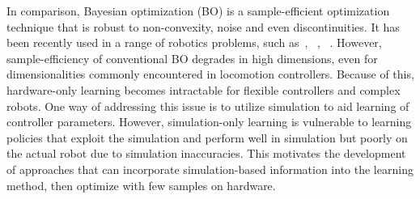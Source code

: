 In comparison, Bayesian optimization (BO) is a sample-efficient optimization technique that is robust to non-convexity, noise and even discontinuities. It has been recently used in a range of robotics problems, such as~\citet{calandra2016bayesian}, ~\citet{marco2017virtual}, ~\citet{cully2015robots}. However, sample-efficiency of conventional BO degrades in high dimensions, even for dimensionalities commonly encountered in locomotion controllers. Because of this, hardware-only learning becomes intractable for flexible controllers and complex robots. One way of addressing this issue is to utilize simulation to aid learning of controller parameters. However, simulation-only learning is vulnerable to learning policies that exploit the simulation and perform well in simulation but poorly on the actual robot due to simulation inaccuracies. 
This motivates the development of approaches that can incorporate simulation-based information into the learning method, then optimize with few samples on hardware. 

